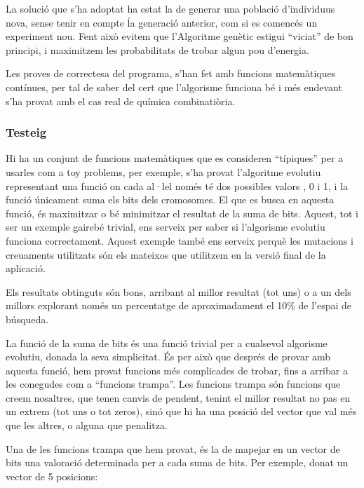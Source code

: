 La solució que s'ha adoptat ha estat la de generar una població d'individuus
nova, sense tenir en compte ĺa generació anterior, com si es comencés un
experiment nou.  Fent això evitem que l'Algoritme genètic estigui ``viciat'' de
bon principi, i maximitzem les probabilitats de trobar algun pou d'energia.

Les proves de correctesa del programa, s'han fet amb funcions matemàtiques
contínues, per tal de saber del cert que l'algorisme funciona bé i més endevant
s'ha provat amb el cas real de química combinatiòria.


\subsubsection{Testeig} %
\label{ssub:Testeig}

Hi ha un conjunt de funcions matemàtiques que es consideren ``típiques'' per a
usarles com a toy problems, per exemple, s'ha provat l'algoritme evolutiu
representant una funció on cada al·lel només té dos possibles valors , 0 i 1, i
la funció únicament suma els bits dels cromosomes.  El que es busca en aquesta
funció, és maximitzar o bé minimitzar el resultat de la suma de bits.  Aquest,
tot i ser un exemple gairebé trivial, ens serveix per saber si l'algorisme
evolutiu funciona correctament.  Aquest exemple també ens serveix perquè les
mutacions i creuaments utilitzats són els mateixos que utilitzem en la versió
final de la aplicació.

Els resultats obtinguts són bons, arribant al millor resultat (tot uns) o a un
dels millors explorant només un percentatge de aproximadament el  10\% de
l'espai de búsqueda.

La funció de la suma de bits és una funció trivial per a cualsevol algorisme
evolutiu, donada la seva simplicitat.  És per això que després de provar amb
aquesta funció, hem provat funcions més complicades de trobar, fins a arribar a
les conegudes com a ``funcions trampa''.  Les funcions trampa són funcions que
creem nosaltres, que tenen canvis de pendent, tenint el millor resultat no pas
en un extrem (tot uns o tot zeros), sinó que hi ha una posició del vector que
val més que les altres, o alguna que penalitza.

Una de les funcions trampa que hem provat, és la de mapejar en un vector de bits
una valoració determinada per a cada suma de bits.  Per exemple, donat un vector
de 5 posicions:

